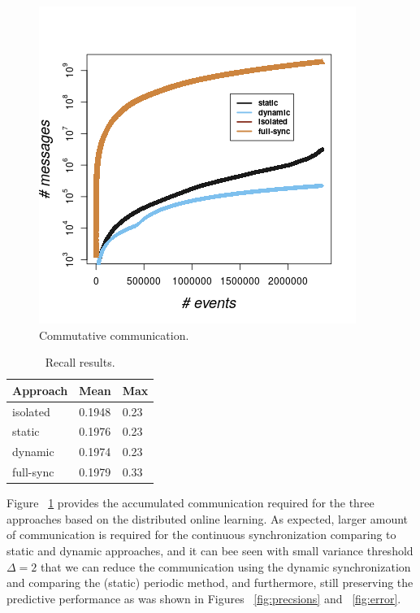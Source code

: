 \begin{figure}[]
	
	\includegraphics[width=.5\textwidth]{figures/communication.png}
	
	\caption{Commutative communication.}
	\label{fig:comm}
\end{figure}
\begin{table}[]
	\caption{Recall results.}
	\label{tab:recall}
	\begin{tabular}{lll}
		\toprule
		Approach &Mean&Max\\
		\midrule
		isolated & 0.1948  & 0.23 \\
		static & 0.1976  &  0.23 \\
		dynamic & 0.1974  & 0.23 \\
		full-sync & 0.1979  & 0.33 \\
		\bottomrule
	\end{tabular}
\end{table}


Figure ~\ref{fig:comm} provides the accumulated communication required for the three approaches based on the distributed online learning. As expected, larger amount of communication is required for the continuous synchronization comparing to static and dynamic approaches, and it can bee seen with small variance threshold $\Delta=2$ that we can reduce the communication using the dynamic synchronization and comparing the (static) periodic method, and furthermore, still preserving the predictive performance as was shown in Figures ~\ref{fig:precsions} and ~\ref{fig:error}.  
